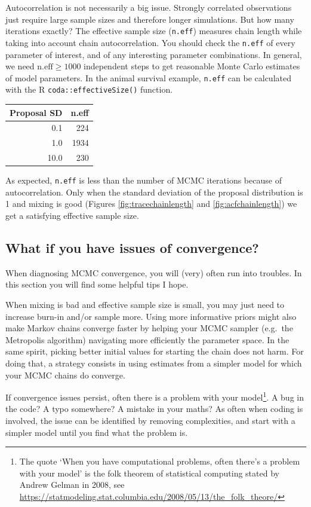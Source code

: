 \documentclass[
  12pt,
]{krantz}
\begin{document}
Autocorrelation is not necessarily a big issue. Strongly correlated observations just require large sample sizes and therefore longer simulations. But how many iterations exactly? The effective sample size (\texttt{n.eff}) measures chain length while taking into account chain autocorrelation. You should check the \texttt{n.eff} of every parameter of interest, and of any interesting parameter combinations. In general, we need \(\text{n.eff} \geq 1000\) independent steps to get reasonable Monte Carlo estimates of model parameters. In the animal survival example, \texttt{n.eff} can be calculated with the R \texttt{coda::effectiveSize()} function.

\begin{longtable}[]{@{}rr@{}}
\toprule()
Proposal SD & n.eff \\
\midrule()
\endhead
0.1 & 224 \\
1.0 & 1934 \\
10.0 & 230 \\
\bottomrule()
\end{longtable}

As expected, \texttt{n.eff} is less than the number of MCMC iterations because of autocorrelation. Only when the standard deviation of the proposal distribution is 1 and mixing is good (Figures \ref{fig:tracechainlength} and \ref{fig:acfchainlength}) we get a satisfying effective sample size.

\hypertarget{what-if-you-have-issues-of-convergence}{%
\subsection{What if you have issues of convergence?}\label{what-if-you-have-issues-of-convergence}}

When diagnosing MCMC convergence, you will (very) often run into troubles. In this section you will find some helpful tips I hope.

When mixing is bad and effective sample size is small, you may just need to increase burn-in and/or sample more. Using more informative priors might also make Markov chains converge faster by helping your MCMC sampler (e.g.~the Metropolis algorithm) navigating more efficiently the parameter space. In the same spirit, picking better initial values for starting the chain does not harm. For doing that, a strategy consists in using estimates from a simpler model for which your MCMC chains do converge.

If convergence issues persist, often there is a problem with your model\footnote{The quote `When you have computational problems, often there's a problem with your model' is the folk theorem of statistical computing stated by Andrew Gelman in 2008, see \url{https://statmodeling.stat.columbia.edu/2008/05/13/the_folk_theore/}}. A bug in the code? A typo somewhere? A mistake in your maths? As often when coding is involved, the issue can be identified by removing complexities, and start with a simpler model until you find what the problem is.
\end{document}
